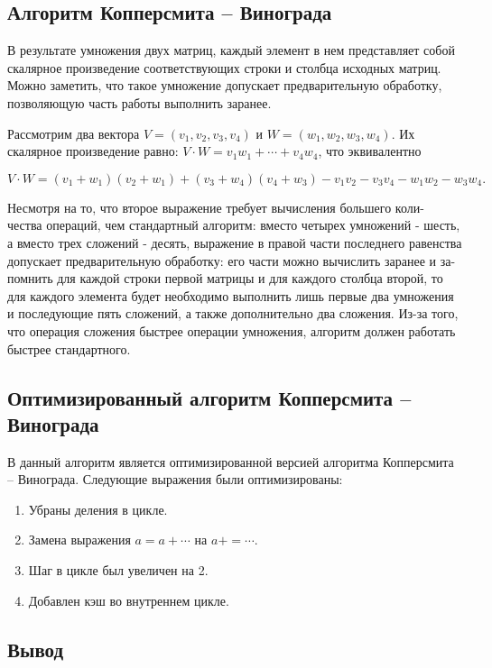 \subsection{Алгоритм Копперсмита -- Винограда}

В результате умножения двух матриц, каждый элемент в нем представляет собой скалярное произведение соответствующих строки и столбца исходных матриц. Можно заметить, что такое умножение допускает предварительную обработку, позволяющую часть работы выполнить заранее.

Рассмотрим два вектора $V = (v_1, v_2, v_3, v_4)$ и $W = (w_1, w_2, w_3, w_4)$. Их скалярное произведение равно: $V \cdot W = v_1 w_1 + \cdots + v_4 w_4$, что эквивалентно

\begin{equation}
    V \cdot W = (v_1 + w_1)(v_2 + w_1) + (v_3 + w_4)(v_4 + w_3) - v_1 v_2 - v_3 v_4 - w_1 w_2 - w_3 w_4.
\end{equation}

Несмотря на то, что второе выражение требует вычисления большего коли- чества операций, чем стандартный алгоритм: вместо четырех умножений - шесть, а вместо трех сложений - десять, выражение в правой части последнего равенства допускает предварительную обработку: его части можно вычислить заранее и за- помнить для каждой строки первой матрицы и для каждого столбца второй, то для каждого элемента будет необходимо выполнить лишь первые два умножения и последующие пять сложений, а также дополнительно два сложения. Из-за того, что операция сложения быстрее операции умножения, алгоритм должен работать быстрее стандартного.
\subsection{Оптимизированный алгоритм Копперсмита -- Винограда}

В данный алгоритм является оптимизированной версией алгоритма Копперсмита -- Винограда. Следующие выражения были оптимизированы:

\begin{enumerate}
    \item Убраны деления в цикле.
    \item Замена выражения $a = a + \cdots$ на $a += \cdots$.
    \item Шаг в цикле был увеличен на 2.
    \item Добавлен кэш во внутреннем цикле.
\end{enumerate}


\subsection{Вывод}

